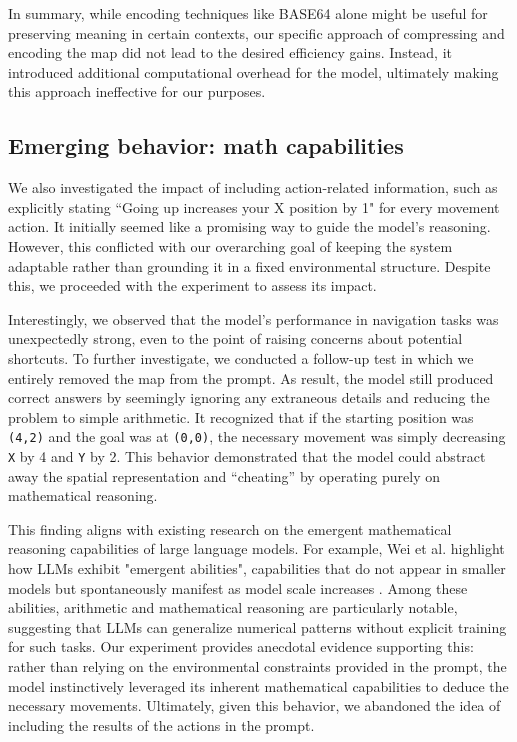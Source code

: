 In summary, while encoding techniques like BASE64 alone might be useful for preserving
meaning in certain contexts, our specific approach of compressing and encoding
the map did not lead to the desired efficiency gains. Instead, it introduced
additional computational overhead for the model, ultimately making this approach
ineffective for our purposes.

\subsection{Emerging behavior: math capabilities}

We also investigated the impact of including action-related information, such as
explicitly stating ``Going up increases your X position by 1" for every movement
action. It initially seemed like a promising way to guide the model's reasoning.
However, this conflicted with our overarching goal of keeping the system adaptable
rather than grounding it in a fixed environmental structure. Despite this, we proceeded
with the experiment to assess its impact.

Interestingly, we observed that the model's performance in navigation tasks was
unexpectedly strong, even to the point of raising concerns about potential shortcuts.
To further investigate, we conducted a follow-up test in which we entirely removed
the map from the prompt. As result, the model still produced correct answers by seemingly
ignoring any extraneous details and reducing the problem to simple arithmetic.
It recognized that if the starting position was \texttt{(4,2)} and the goal was at
\texttt{(0,0)}, the necessary movement was simply decreasing \texttt{X} by 4 and
\texttt{Y} by 2. This behavior demonstrated that the model could abstract away the
spatial representation and ``cheating'' by operating purely on mathematical reasoning.

This finding aligns with existing research on the emergent mathematical reasoning
capabilities of large language models. For example, Wei et al. highlight how
LLMs exhibit "emergent abilities", capabilities that do not appear in smaller models
but spontaneously manifest as model scale increases \cite{wei2022emergentabilitieslargelanguage}.
Among these abilities, arithmetic and mathematical reasoning are particularly notable,
suggesting that LLMs can generalize numerical patterns without explicit training
for such tasks. Our experiment provides anecdotal evidence supporting this:
rather than relying on the environmental constraints provided in the prompt, the
model instinctively leveraged its inherent mathematical capabilities to deduce the
necessary movements. Ultimately, given this behavior, we abandoned the idea of
including the results of the actions in the prompt.

